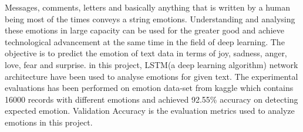 Messages, comments, letters and basically anything that is written by a human being most of the times conveys a string emotions. Understanding and analysing these emotions in large capacity can be used for the greater good and achieve technological advancement at the same time in the field of deep learning. The objective is to predict the emotion of text data in terms of joy, sadness, anger, love, fear and surprise. in this project, LSTM(a deep learning algorithm) network architecture have been used to analyse emotions for given text. The experimental evaluations has been performed on emotion data-set from kaggle which contains 16000 records with different emotions and achieved 92.55\% accuracy on detecting expected emotion. Validation Accuracy is the evaluation metrics used to analyze emotions in this project.
\endinput
